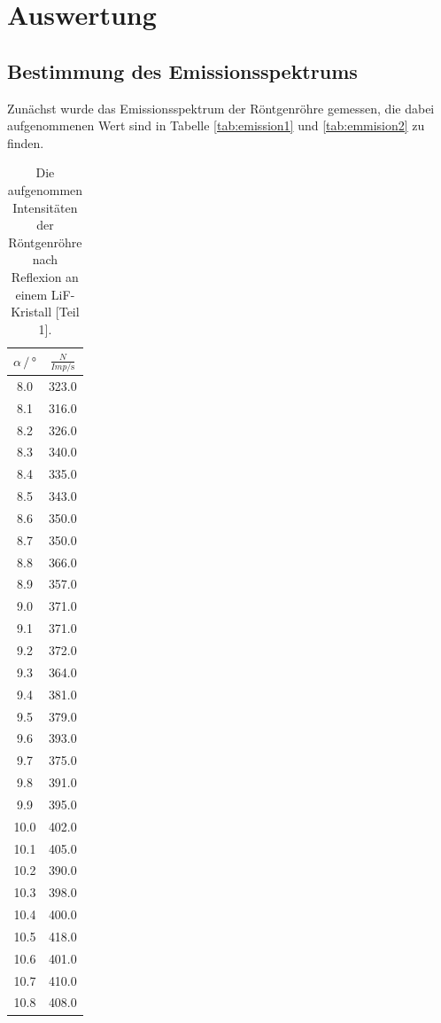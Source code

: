 \section{Auswertung}
\label{sec:Auswertung}
\FloatBarrier
\subsection{Bestimmung des Emissionsspektrums}
Zunächst wurde das Emissionsspektrum der Röntgenröhre gemessen, die dabei aufgenommenen Wert sind in Tabelle \ref{tab:emission1} und \ref{tab:emmision2} zu finden.
\begin{table}
\centering
  \caption{Die aufgenommen Intensitäten der Röntgenröhre nach Reflexion an einem LiF-Kristall [Teil 1].}
  \begin{tabular}[t]{cc}
  \toprule
  $\alpha \,/\, \si{\degree} $ & $\frac{N}{Imp/\si{\second}}$\\
  \midrule
  8.0 & 323.0 \\
  8.1 & 316.0\\
  8.2 & 326.0\\
  8.3 & 340.0\\
  8.4 & 335.0\\
  8.5 & 343.0\\
  8.6 & 350.0\\
  8.7 & 350.0\\
  8.8 & 366.0\\
  8.9 & 357.0\\
  9.0 & 371.0\\
  9.1 & 371.0\\
  9.2 & 372.0\\
  9.3 & 364.0\\
  9.4 & 381.0\\
  9.5 & 379.0\\
  9.6 & 393.0\\
  9.7 & 375.0\\
  9.8 & 391.0\\
  9.9 & 395.0\\
  10.0 & 402.0\\
  10.1 & 405.0\\
  10.2 & 390.0\\
  10.3 & 398.0\\
  10.4 & 400.0\\
  10.5 & 418.0\\
  10.6 & 401.0\\
  10.7 & 410.0\\
  10.8 & 408.0\\
  \bottomrule
  \end{tabular}

\end{table}
